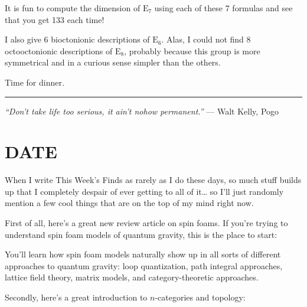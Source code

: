\documentclass{article}
\def\tightlist{}
\renewcommand{\texttt}[1]{%
  \begingroup
  \ttfamily
  \begingroup\lccode`~=`/\lowercase{\endgroup\def~}{/\discretionary{}{}{}}%
  \begingroup\lccode`~=`[\lowercase{\endgroup\def~}{[\discretionary{}{}{}}%
  \begingroup\lccode`~=`.\lowercase{\endgroup\def~}{.\discretionary{}{}{}}%
  \catcode`/=\active\catcode`[=\active\catcode`.=\active
  \scantokens{#1\noexpand}%
  \endgroup
}
\begin{document}
It is fun to compute the dimension of \(\mathrm{E}_7\) using each of
these 7 formulas and see that you get 133 each time!

I also give 6 bioctonionic descriptions of \(\mathrm{E}_6\). Alas, I
could not find 8 octooctonionic descriptions of \(\mathrm{E}_8\),
probably because this group is more symmetrical and in a curious sense
simpler than the others.

Time for dinner.

\begin{center}\rule{0.5\linewidth}{0.5pt}\end{center}

\emph{``Don't take life too serious, it ain't nohow permanent.''} ---
Walt Kelly, Pogo
\hypertarget{week169}{%
\section{DATE}\label{week169}}

When I write This Week's Finds as rarely as I do these days, so much
stuff builds up that I completely despair of ever getting to all of
it\ldots{} so I'll just randomly mention a few cool things that are on
the top of my mind right now.

First of all, here's a great new review article on spin foams. If you're
trying to understand spin foam models of quantum gravity, this is the
place to start:


You'll learn how spin foam models naturally show up in all sorts of
different approaches to quantum gravity: loop quantization, path
integral approaches, lattice field theory, matrix models, and
category-theoretic approaches.

Secondly, here's a great introduction to \(n\)-categories and topology:

\end{document}

